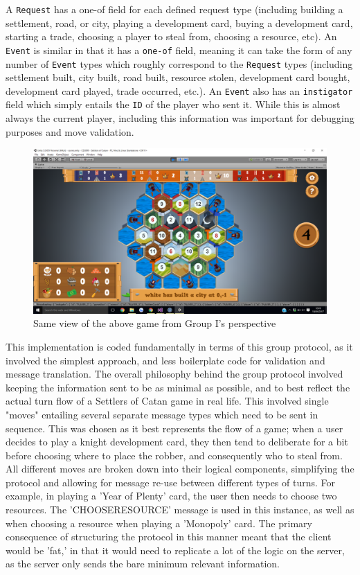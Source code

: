 \documentclass[a4paper,doc]{apa6}
\newcommand{\code}{\texttt}
\begin{document}
A \code{Request} has a one-of field for each defined request type (including building a settlement, road, or city, playing a development card, buying a development card, starting a trade, choosing a player to steal from, choosing a resource, etc). An \code{Event} is similar in that it has a \code{one-of} field, meaning it can take the form of any number of \code{Event} types which roughly correspond to the \code{Request} types (including settlement built, city built, road built, resource stolen, development card bought, development card played, trade occurred, etc.). An \code{Event} also has an \code{instigator} field which simply entails the \code{ID} of the player who sent it. While this is almost always the current player, including this information was important for debugging purposes and move validation.


\begin{figure}[hbtp]
      \includegraphics[width=\textwidth]{GroupI}
      \caption{Same view of the above game from Group I's perspective}
\end{figure}

This implementation is coded fundamentally in terms of this group protocol, as it involved the simplest approach, and less boilerplate code for validation and message translation. The overall philosophy behind the group protocol involved keeping the information sent to be as minimal as possible, and to best reflect the actual turn flow of a Settlers of Catan game in real life. This involved single "moves" entailing several separate message types which need to be sent in sequence. This was chosen as it best represents the flow of a game; when a user decides to play a knight development card, they then tend to deliberate for a bit before choosing where to place the robber, and consequently who to steal from. All different moves are broken down into their logical components, simplifying the protocol and allowing for message re-use between different types of turns. For example, in playing a 'Year of Plenty' card, the user then needs to choose two resources. The 'CHOOSERESOURCE' message is used in this instance, as well as when choosing a resource when playing a 'Monopoly' card. The primary consequence of structuring the protocol in this manner meant that the client would be 'fat,' in that it would need to replicate a lot of the logic on the server, as the server only sends the bare minimum relevant information.
\end{document}
